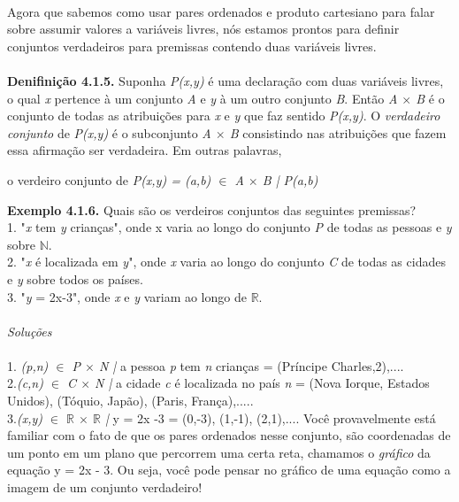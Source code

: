     \\
 \indent   Agora que sabemos como usar pares ordenados e produto cartesiano para falar sobre assumir valores a variáveis livres, nós estamos prontos para definir conjuntos verdadeiros para premissas contendo duas variáveis livres.
    \\
    \\
    \textbf{Denifinição 4.1.5.} Suponha \textit{P(x,y)} é uma declaração com duas variáveis livres, o qual \textit{x} pertence à um conjunto \textit{A} e \textit{y} à um outro conjunto \textit{B}. Então \textit{A $\times$ B} é o conjunto de todas as atribuições para \textit{x} e \textit{y} que faz sentido \textit{P(x,y)}. O \textit{verdadeiro conjunto} de \textit{P(x,y)} é o subconjunto \textit{A $\times$ B} consistindo nas atribuições que fazem essa afirmação ser verdadeira. Em outras palavras,
    \\
    \begin{center} 
    o verdeiro conjunto de \textit{P(x,y) = {(a,b) $\in$ A $\times$ B | P(a,b)}}
	 \end{center}
\textbf{ Exemplo 4.1.6.} Quais são os verdeiros conjuntos das seguintes premissas?
\\
	1. "\textit{x} tem \textit{y} crianças", onde x varia ao longo do conjunto \textit{P} de todas as pessoas e \textit{y} sobre  $\mathbb{N}$. 
\\
   2. "\textit{x} é localizada em \textit{y}", onde \textit{x} varia ao longo do conjunto \textit{C} de todas as cidades e \textit{y} sobre todos os países. 
\\
	3. "\textit{y} = 2x-3", onde \textit{x} e \textit{y} variam ao longo de $\mathbb{R}$.
    \\
    \\
    \textit{Soluções}
    \\
    \\
    1. {\textit{(p,n) $\in$ P $\times$ N |} a pessoa \textit{p} tem \textit{n} crianças} = {(Príncipe Charles,2),...}.\\
   	2.{\textit{(c,n) $\in$ C $\times$ N |} a cidade \textit{c} é localizada no país \textit{n}} = {(Nova Iorque, Estados Unidos), (Tóquio, Japão), (Paris, França),....}.\\
    3.{\textit{(x,y) $\in$ $\mathbb{R}$ $\times$ $\mathbb{R}$ |} y = 2x -3} = {(0,-3), (1,-1), (2,1),...}. Você provavelmente está familiar com o fato de que os pares ordenados nesse conjunto, são coordenadas de um ponto em um plano  que percorrem uma certa reta, chamamos o \textit{gráfico} da equação y = 2x - 3. Ou seja, você pode pensar no gráfico de uma equação como a imagem de um conjunto verdadeiro!

